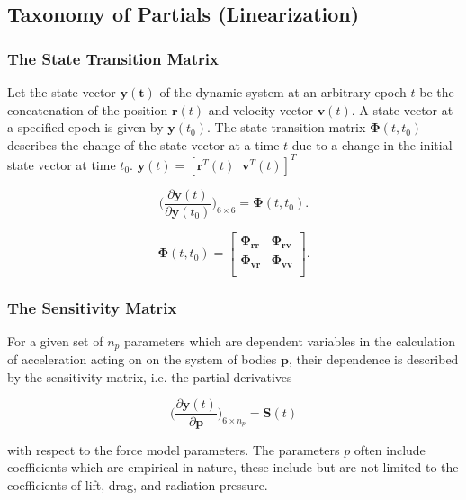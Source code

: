 
\subsection{Taxonomy of Partials (Linearization)}

\subsubsection{The State Transition Matrix}

Let the state vector $\mathbf{y(t)}$ of the dynamic system at an arbitrary epoch
$t$ be the concatenation of the position $\mathbf{r}(t)$ and velocity vector
$\mathbf{v}(t)$. A state vector at a specified epoch is given by
$\mathbf{y}(t_0)$. The state transition matrix $\bm{\Phi}(t,t_0)$ describes the
change of the state vector at a time $t$ due to a change in the initial state
vector at time $t_0$. $\bm{y}(t)=[\bm{r}^T(t)\;\;\bm{v}^T(t)]^T$

\begin{equation}
    \bigg(\frac{\partial\mathbf{y}(t)}{\partial{\mathbf{y}(t_0)}}\bigg)_{6\times{6}}=\bm{\Phi}(t, t_0).
    \label{eq:linear_stm}
\end{equation}

\begin{equation}
    \bm{\Phi}(t, t_0) =
    \begin{bmatrix}
        \bm{\Phi}_{\bm{rr}} & \bm{\Phi}_{\bm{rv}} \\
        \bm{\Phi}_{\bm{vr}} & \bm{\Phi}_{\bm{vv}} \\
    \end{bmatrix}.
\end{equation}

\subsubsection{The Sensitivity Matrix}

For a given set of $n_p$ parameters which are dependent variables in
the calculation of acceleration acting on on the system of bodies $\mathbf{p}$,
their dependence is described by the sensitivity matrix, i.e. the partial
derivatives

\begin{equation}
    \bigg(\frac{\partial\mathbf{y}(t)}{\partial{\mathbf{p}}}\bigg)_{6\times{n_p}}=\bm{S}(t)
\end{equation}

with respect to the force model parameters. The parameters $p$ often include
coefficients which are empirical in nature, these include but are not limited to
the coefficients of lift, drag, and radiation pressure.

